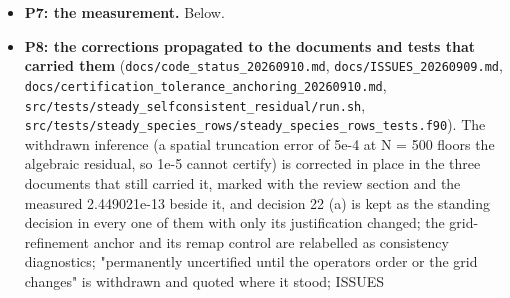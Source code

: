 \documentclass[english,a4paper]{my_memo}
\begin{document}
\begin{itemize}
  update still makes progress from. The endings are named
  (\texttt{outer\_certified}, \texttt{outer\_state\_not\_finite},
  \texttt{outer\_element\_update\_refused}, \texttt{outer\_no\_progress}, \texttt{outer\_pass\_budget}),
  the P1 status is consumed, and the quantity the passes are controlled by is
  the worst gated species row of the certification: where it fails to fall
  over a pass both updates are shortened (the element under-relaxation omega
  halved, floor 0.125; the carrier movement bound halved, floor
  \texttt{carrier\_trust\_floor\ =\ 1.0d-3}) and \texttt{outer\_no\_fall\_max\ =\ 3} consecutive
  passes without a fall end the loop. The last pass takes no composition
  update, because an update exists to be consumed by the next hydrodynamic
  solve and taking it would replace a stationary wind by a state the update
  itself spoiled. The composition drift and the volume-weighted carrier
  residual are reported and are not tests. With no alternated species the
  body is one steady solve and the state refresh, and the flag is the solve\textquotesingle s
  own, which is what an atomic run and a coupled carrier solve both do.
  Default path MEASURED on the P6 run pair (\texttt{wasp\_full\_newton.ctrl} against
  \texttt{.new}): \texttt{info\ =\ 0}, \texttt{\textbar{}\textbar{}R\textbar{}\textbar{}} 1.667E-09, flux spread 6.233E-14, CERTIFIED,
  \texttt{log10\ Mdot} 13.30, and \texttt{output/Ion\_species.txt} and
  \texttt{output/Hydro\_ioniz.txt} byte-identical between the two.
\item
  \textbf{P7: the measurement.} Below.
\item
  \textbf{P8: the corrections propagated to the documents and tests that carried
  them} (\texttt{docs/code\_status\_20260910.md}, \texttt{docs/ISSUES\_20260909.md},
  \texttt{docs/certification\_tolerance\_anchoring\_20260910.md},
  \texttt{src/tests/steady\_selfconsistent\_residual/run.sh},
  \texttt{src/tests/steady\_species\_rows/steady\_species\_rows\_tests.f90}). The
  withdrawn inference (a spatial truncation error of 5e-4 at N = 500 floors
  the algebraic residual, so 1e-5 cannot certify) is corrected in place in
  the three documents that still carried it, marked with the review section
  and the measured 2.449021e-13 beside it, and decision 22 (a) is kept as the
  standing decision in every one of them with only its justification changed;
  the grid-refinement anchor and its remap control are relabelled as
  consistency diagnostics; "permanently uncertified until the operator\textquotesingle s
  order or the grid changes" is withdrawn and quoted where it stood; ISSUES

\end{itemize}
\end{document}
